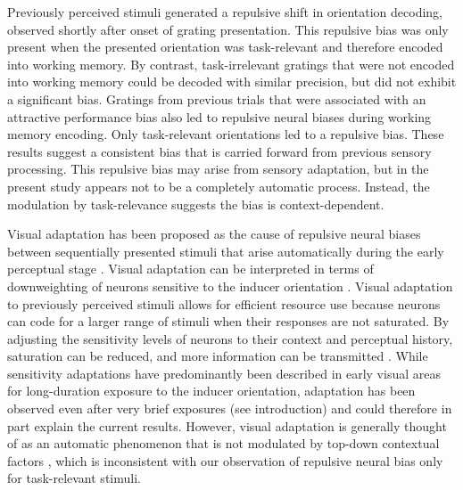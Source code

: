 \documentclass{article}
\begin{document}
Previously perceived stimuli generated a repulsive shift in orientation decoding, observed shortly after onset of grating presentation. This repulsive bias was only present when the presented orientation was task-relevant and therefore encoded into working memory. By contrast, task-irrelevant gratings that were not encoded into working memory could be decoded with similar precision, but did not exhibit a significant bias. Gratings from previous trials that were associated with an attractive performance bias also led to repulsive neural biases during working memory encoding. Only task-relevant orientations led to a repulsive bias. These results suggest a consistent bias that is carried forward from previous sensory processing. This repulsive bias may arise from sensory adaptation, but in the present study appears not to be a completely automatic process. Instead, the modulation by task-relevance suggests the bias is context-dependent. 

Visual adaptation has been proposed as the cause of repulsive neural biases between sequentially presented stimuli that arise automatically during the early perceptual stage \parencite{Jazayeri2006, Jazayeri2007, Stocker2008, Webster2015, Kohn2007} . Visual adaptation can be interpreted in terms of downweighting of neurons sensitive to the inducer orientation \parencite{Clifford2000, Wainwright1999}. Visual adaptation to previously perceived stimuli allows for efficient resource use \parencite{Stocker2008, Webster2015} because neurons can code for a larger range of stimuli when their responses are not saturated. By adjusting the sensitivity levels of neurons to their context and perceptual history, saturation can be reduced, and more information can be transmitted \parencite{Webster2015}. While sensitivity adaptations have predominantly been described in early visual areas for long-duration exposure to the inducer orientation, adaptation has been observed even after very brief exposures (see introduction) and could therefore in part explain the current results. However, visual adaptation is generally thought of as an automatic phenomenon that is not modulated by top-down contextual factors \parencite{Webster2015, Kohn2007}, which is inconsistent with our observation of repulsive neural bias only for task-relevant stimuli.
\end{document}
